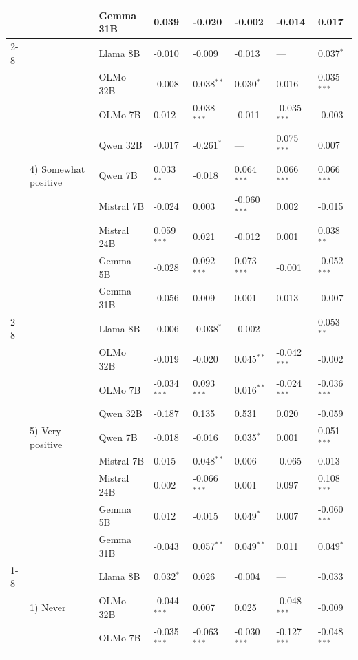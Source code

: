 \begin{longtable}[t]{llllllll}
 &  & Gemma 31B & 0.039 & -0.020 & -0.002 & -0.014 & 0.017 \\
\cline{2-8}
 & \multirow[t]{9}{*}{4) Somewhat positive} & Llama 8B & -0.010 & -0.009 & -0.013 & --- & 0.037$^{*}$ \\
 &  & OLMo 32B & -0.008 & 0.038$^{**}$ & 0.030$^{*}$ & 0.016 & 0.035$^{***}$ \\
 &  & OLMo 7B & 0.012 & 0.038$^{***}$ & -0.011 & -0.035$^{***}$ & -0.003 \\
 &  & Qwen 32B & -0.017 & -0.261$^{*}$ & --- & 0.075$^{***}$ & 0.007 \\
 &  & Qwen 7B & 0.033$^{**}$ & -0.018 & 0.064$^{***}$ & 0.066$^{***}$ & 0.066$^{***}$ \\
 &  & Mistral 7B & -0.024 & 0.003 & -0.060$^{***}$ & 0.002 & -0.015 \\
 &  & Mistral 24B & 0.059$^{***}$ & 0.021 & -0.012 & 0.001 & 0.038$^{**}$ \\
 &  & Gemma 5B & -0.028 & 0.092$^{***}$ & 0.073$^{***}$ & -0.001 & -0.052$^{***}$ \\
 &  & Gemma 31B & -0.056 & 0.009 & 0.001 & 0.013 & -0.007 \\
\cline{2-8}
 & \multirow[t]{9}{*}{5) Very positive} & Llama 8B & -0.006 & -0.038$^{*}$ & -0.002 & --- & 0.053$^{**}$ \\
 &  & OLMo 32B & -0.019 & -0.020 & 0.045$^{**}$ & -0.042$^{***}$ & -0.002 \\
 &  & OLMo 7B & -0.034$^{***}$ & 0.093$^{***}$ & 0.016$^{**}$ & -0.024$^{***}$ & -0.036$^{***}$ \\
 &  & Qwen 32B & -0.187 & 0.135 & 0.531 & 0.020 & -0.059 \\
 &  & Qwen 7B & -0.018 & -0.016 & 0.035$^{*}$ & 0.001 & 0.051$^{***}$ \\
 &  & Mistral 7B & 0.015 & 0.048$^{**}$ & 0.006 & -0.065 & 0.013 \\
 &  & Mistral 24B & 0.002 & -0.066$^{***}$ & 0.001 & 0.097 & 0.108$^{***}$ \\
 &  & Gemma 5B & 0.012 & -0.015 & 0.049$^{*}$ & 0.007 & -0.060$^{***}$ \\
 &  & Gemma 31B & -0.043 & 0.057$^{**}$ & 0.049$^{**}$ & 0.011 & 0.049$^{*}$ \\
\cline{1-8} \cline{2-8}
\multirow[t]{45}{*}{Toxicity Problem} & \multirow[t]{9}{*}{1) Never} & Llama 8B & 0.032$^{*}$ & 0.026 & -0.004 & --- & -0.033 \\
 &  & OLMo 32B & -0.044$^{***}$ & 0.007 & 0.025 & -0.048$^{***}$ & -0.009 \\
 &  & OLMo 7B & -0.035$^{***}$ & -0.063$^{***}$ & -0.030$^{***}$ & -0.127$^{***}$ & -0.048$^{***}$ \\

\end{longtable}
